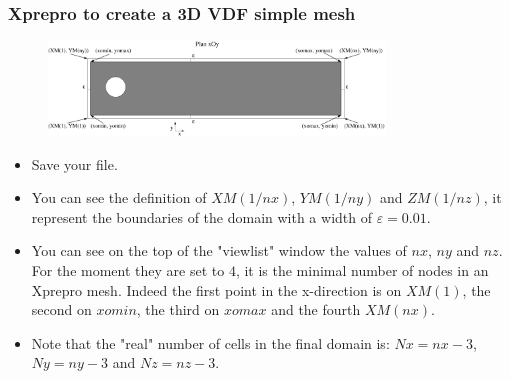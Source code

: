 \documentclass[10pt, hyperref={unicode=true,pdfusetitle, bookmarks=true,bookmarksnumbered=false,bookmarksopen=false, breaklinks=false,pdfborder={0 0 1},backref=true,colorlinks=true,linkcolor=darkblue,pageanchor}]{beamer}
\begin{document}
\begin{frame}
\frametitle{Xprepro to create a 3D VDF simple mesh}
\begin{block}{}

\begin{figure}
\includegraphics[width=0.8\textwidth]{PICTURES/xprepro1.pdf}
\end{figure}

\begin{itemize}
\item Save your file.
\item You can see the definition of $XM(1/nx)$, $YM(1/ny)$ and $ZM(1/nz)$, it represent the boundaries of the domain with a width of $\varepsilon=0.01$.
\item You can see on the top of the "viewlist" window the values of $nx$, $ny$ and $nz$. For the moment they are set to $4$, it is the minimal number of nodes in an Xprepro mesh. Indeed the first point in the x-direction is on $XM(1)$, the second on $xomin$, the third on $xomax$ and the fourth $XM(nx)$.
\item Note that the "real" number of cells in the final domain is: $Nx=nx-3$, $Ny=ny-3$ and $Nz=nz-3$.
\end{itemize}

\end{block}
\end{frame}
\end{document}
